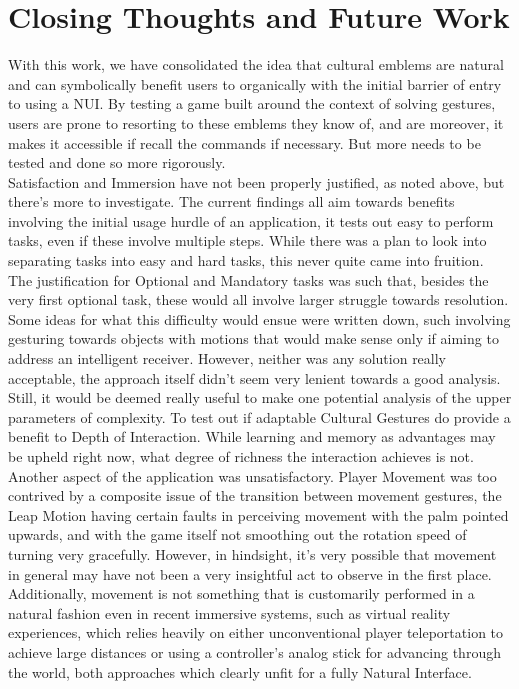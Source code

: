 \section{Closing Thoughts and Future Work} \label{sec:results_End}
    With this work, we have consolidated the idea that cultural emblems are natural and can symbolically benefit users to organically with the initial barrier of entry to using a NUI. By testing a game built around the context of solving gestures, users are prone to resorting to these emblems they know of, and are moreover, it makes it accessible if recall the commands if necessary. But more needs to be tested and done so more rigorously.\\
    Satisfaction and Immersion have not been properly justified, as noted above, but there's more to investigate. The current findings all aim towards benefits involving the initial usage hurdle of an application, it tests out easy to perform tasks, even if these involve multiple steps. While there was a plan to look into separating tasks into easy and hard tasks, this never quite came into fruition. The justification for Optional and Mandatory tasks was such that, besides the very first optional task, these would all involve larger struggle towards resolution. Some ideas for what this difficulty would ensue were written down, such involving gesturing towards objects with motions that would make sense only if aiming to address an intelligent receiver. However, neither was any solution really acceptable, the approach itself didn't seem very lenient towards a good analysis. Still, it would be deemed really useful to make one potential analysis of the upper parameters of complexity. To test out if adaptable Cultural Gestures do provide a benefit to Depth of Interaction. While learning and memory as advantages may be upheld right now, what degree of richness the interaction achieves is not.\\
    Another aspect of the application was unsatisfactory. Player Movement was too contrived by a composite issue of the transition between movement gestures, the Leap Motion having certain faults in perceiving movement with the palm pointed upwards, and with the game itself not smoothing out the rotation speed of turning very gracefully. However, in hindsight, it's very possible that movement in general may have not been a very insightful act to observe in the first place. Additionally, movement is not something that is customarily performed in a natural fashion even in recent immersive systems, such as virtual reality experiences, which relies heavily on either unconventional player teleportation to achieve large distances or using a controller’s analog stick for advancing through the world, both approaches which clearly unfit for a fully Natural Interface.\\
